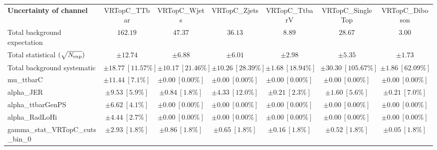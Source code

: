 
\begin{sidewaystable}
\begin{center}
\setlength{\tabcolsep}{0.0pc}
\begin{tabular*}{\textwidth}{@{\extracolsep{\fill}}lcccccc}
\noalign{\smallskip}\hline\noalign{\smallskip}
{\bf Uncertainty of channel}                                    & VRTopC\_TTbar            & VRTopC\_Wjets            & VRTopC\_Zjets            & VRTopC\_TtbarV            & VRTopC\_SingleTop            & VRTopC\_Diboson            \\
\noalign{\smallskip}\hline\noalign{\smallskip}
Total background expectation             &  $162.19$        &  $47.37$        &  $36.13$        &  $8.89$        &  $28.67$        &  $3.00$       \\
\noalign{\smallskip}\hline\noalign{\smallskip}
Total statistical $(\sqrt{N_{\rm exp}})$              & $\pm 12.74$        & $\pm 6.88$        & $\pm 6.01$        & $\pm 2.98$        & $\pm 5.35$        & $\pm 1.73$       \\
Total background systematic               & $\pm 18.77\ [11.57\%] $        & $\pm 10.17\ [21.46\%] $        & $\pm 10.26\ [28.39\%] $        & $\pm 1.68\ [18.94\%] $        & $\pm 30.30\ [105.67\%] $        & $\pm 1.86\ [62.09\%] $             \\
\noalign{\smallskip}\hline\noalign{\smallskip}
\noalign{\smallskip}\hline\noalign{\smallskip}
mu\_ttbarC         & $\pm 11.44\ [7.1\%] $          & $\pm 0.00\ [0.00\%] $          & $\pm 0.00\ [0.00\%] $          & $\pm 0.00\ [0.00\%] $          & $\pm 0.00\ [0.00\%] $          & $\pm 0.00\ [0.00\%] $       \\
alpha\_JER         & $\pm 9.53\ [5.9\%] $          & $\pm 0.84\ [1.8\%] $          & $\pm 4.33\ [12.0\%] $          & $\pm 0.21\ [2.3\%] $          & $\pm 1.60\ [5.6\%] $          & $\pm 0.21\ [7.0\%] $       \\
alpha\_ttbarGenPS         & $\pm 6.62\ [4.1\%] $          & $\pm 0.00\ [0.00\%] $          & $\pm 0.00\ [0.00\%] $          & $\pm 0.00\ [0.00\%] $          & $\pm 0.00\ [0.00\%] $          & $\pm 0.00\ [0.00\%] $       \\
alpha\_RadLoHi         & $\pm 4.44\ [2.7\%] $          & $\pm 0.00\ [0.00\%] $          & $\pm 0.00\ [0.00\%] $          & $\pm 0.00\ [0.00\%] $          & $\pm 0.00\ [0.00\%] $          & $\pm 0.00\ [0.00\%] $       \\
gamma\_stat\_VRTopC\_cuts\_bin\_0         & $\pm 2.93\ [1.8\%] $          & $\pm 0.86\ [1.8\%] $          & $\pm 0.65\ [1.8\%] $          & $\pm 0.16\ [1.8\%] $          & $\pm 0.52\ [1.8\%] $          & $\pm 0.05\ [1.8\%] $       \\

\end{tabular*}
\end{center}
\end{sidewaystable}
